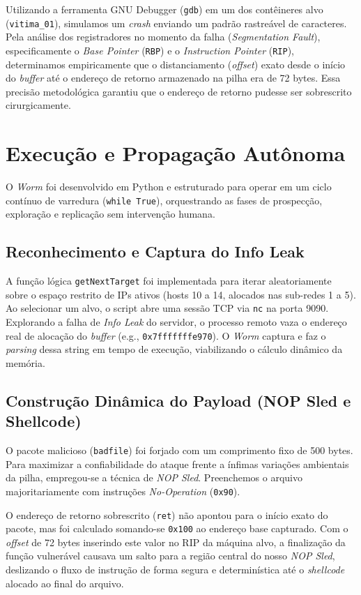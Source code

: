 \documentclass{article}
\begin{document}
Utilizando a ferramenta GNU Debugger (\texttt{gdb}) em um dos contêineres alvo (\texttt{vitima\_01}), simulamos um \textit{crash} enviando um padrão rastreável de caracteres. Pela análise dos registradores no momento da falha (\textit{Segmentation Fault}), especificamente o \textit{Base Pointer} (\texttt{RBP}) e o \textit{Instruction Pointer} (\texttt{RIP}), determinamos empiricamente que o distanciamento (\textit{offset}) exato desde o início do \textit{buffer} até o endereço de retorno armazenado na pilha era de 72 bytes. Essa precisão metodológica garantiu que o endereço de retorno pudesse ser sobrescrito cirurgicamente.

\section{Execução e Propagação Autônoma}
O \textit{Worm} foi desenvolvido em Python e estruturado para operar em um ciclo contínuo de varredura (\texttt{while True}), orquestrando as fases de prospecção, exploração e replicação sem intervenção humana.

\subsection{Reconhecimento e Captura do Info Leak}
A função lógica \texttt{getNextTarget} foi implementada para iterar aleatoriamente sobre o espaço restrito de IPs ativos (hosts 10 a 14, alocados nas sub-redes 1 a 5). Ao selecionar um alvo, o script abre uma sessão TCP via \texttt{nc} na porta 9090. Explorando a falha de \textit{Info Leak} do servidor, o processo remoto vaza o endereço real de alocação do \textit{buffer} (e.g., \texttt{0x7fffffffe970}). O \textit{Worm} captura e faz o \textit{parsing} dessa string em tempo de execução, viabilizando o cálculo dinâmico da memória.

\subsection{Construção Dinâmica do Payload (NOP Sled e Shellcode)}
O pacote malicioso (\texttt{badfile}) foi forjado com um comprimento fixo de 500 bytes. Para maximizar a confiabilidade do ataque frente a ínfimas variações ambientais da pilha, empregou-se a técnica de \textit{NOP Sled}. Preenchemos o arquivo majoritariamente com instruções \textit{No-Operation} (\texttt{0x90}).

O endereço de retorno sobrescrito (\texttt{ret}) não apontou para o início exato do pacote, mas foi calculado somando-se \texttt{0x100} ao endereço base capturado. Com o \textit{offset} de 72 bytes inserindo este valor no RIP da máquina alvo, a finalização da função vulnerável causava um salto para a região central do nosso \textit{NOP Sled}, deslizando o fluxo de instrução de forma segura e determinística até o \textit{shellcode} alocado ao final do arquivo.
\end{document}

